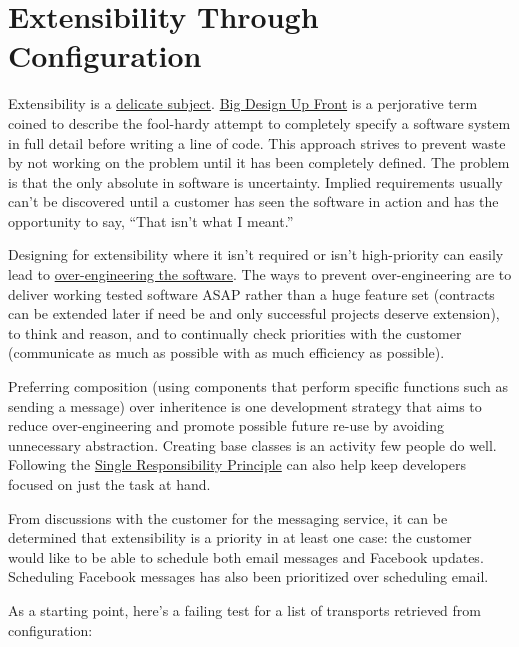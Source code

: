 
\chapter{Extensibility Through Configuration}

Extensibility is a \href{http://webarya.wordpress.com/2010/05/28/my-ten-development-principles/}{delicate subject}. \href{http://c2.com/xp/BigDesignUpFront.html}{Big Design Up Front} is a perjorative term coined to describe the fool-hardy attempt to completely specify a software system in full detail before writing a line of code. This approach strives to prevent waste by not working on the problem until it has been completely defined. The problem is that the only absolute in software is uncertainty. Implied requirements usually can't be discovered until a customer has seen the software in action and has the opportunity to say, ``That isn't what I meant.'' 

Designing for extensibility where it isn't required or isn't high-priority can easily lead to \href{http://blog.digitalstruct.com/2008/02/17/over-engineering-software/}{over-engineering the software}. The ways to prevent over-engineering are to deliver working tested software ASAP rather than a huge feature set (contracts can be extended later if need be and only successful projects deserve extension), to think and reason, and to continually check priorities with the customer (communicate as much as possible with as much efficiency as possible).

Preferring composition (using components that perform specific functions such as sending a message) over inheritence is one development strategy that aims to reduce over-engineering and promote possible future re-use by avoiding unnecessary abstraction. Creating base classes is an activity few people do well. Following the \href{http://www.objectmentor.com/resources/articles/srp.pdf}{Single Responsibility Principle} can also help keep developers focused on just the task at hand.

From discussions with the customer for the messaging service, it can be determined that extensibility is a priority in at least one case: the customer would like to be able to schedule both email messages and Facebook updates. Scheduling Facebook messages has also been prioritized over scheduling email.

As a starting point, here's a failing test for a list of transports retrieved from configuration:

